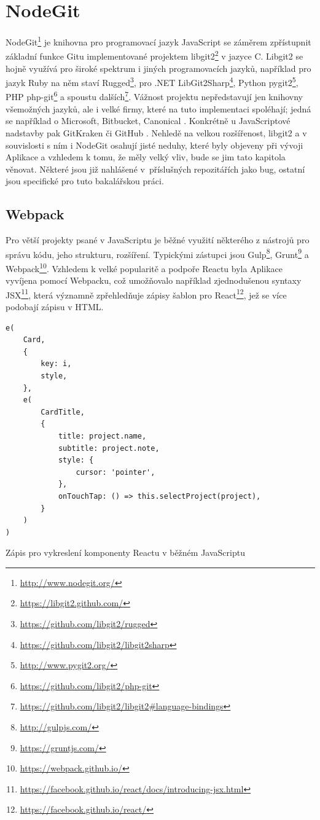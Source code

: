 \chapter{NodeGit}

NodeGit\footnote{\url{http://www.nodegit.org/}} je knihovna pro programovací jazyk JavaScript se záměrem zpřístupnit základní funkce Gitu implementované projektem libgit2\footnote{\url{https://libgit2.github.com/}} v jazyce C. Libgit2 se hojně využívá pro široké spektrum i jiných programovacích jazyků, například pro jazyk Ruby na něm staví Rugged\footnote{\url{https://github.com/libgit2/rugged}}, pro .NET LibGit2Sharp\footnote{\url{https://github.com/libgit2/libgit2sharp}}, Python pygit2\footnote{\url{http://www.pygit2.org/}}, PHP php-git\footnote{\url{https://github.com/libgit2/php-git}} a spoustu dalších\footnote{\url{https://github.com/libgit2/libgit2\#language-bindings}}. Vážnost projektu nepředstavují jen knihovny všemožných jazyků, ale i velké firmy, které na tuto implementaci spoléhají; jedná se například o Microsoft, Bitbucket, Canonical \cite{libgit2-companies}. Konkrétně u JavaScriptové nadstavby pak GitKraken či GitHub \cite{nodegit-products}. Nehledě na velkou rozšířenost, libgit2 a v souvislosti s ním i NodeGit osahují jisté neduhy, které byly objeveny při vývoji Aplikace a vzhledem k tomu, že měly velký vliv, bude se jim tato kapitola věnovat. Některé jsou již nahlášené v~příslušných repozitářích jako bug, ostatní jsou specifické pro tuto bakalářskou práci.

\section{Webpack}

Pro větší projekty psané v JavaScriptu je běžné využití některého z nástrojů pro správu kódu, jeho strukturu, rozšíření. Typickými zástupci jsou Gulp\footnote{\url{http://gulpjs.com/}}, Grunt\footnote{\url{https://gruntjs.com/}} a Webpack\footnote{\url{https://webpack.github.io/}}. Vzhledem k velké popularitě a podpoře Reactu byla Aplikace vyvíjena pomocí Webpacku, což umožňovalo například zjednodušenou syntaxy JSX\footnote{\url{https://facebook.github.io/react/docs/introducing-jsx.html}}, která významně zpřehledňuje zápisy šablon pro React\footnote{\url{https://facebook.github.io/react/}}, jež se více podobají zápisu v HTML.

\begin{listing}[ht]
\begin{verbatim}
e(
	Card,
	{
		key: i,
		style,
	},
	e(
		CardTitle,
		{
			title: project.name,
			subtitle: project.note,
			style: {
				cursor: 'pointer',
			},
			onTouchTap: () => this.selectProject(project),
		}
	)
)
\end{verbatim}
\caption[Komponenta v JavaScriptu]{Zápis pro vykreslení komponenty Reactu v běžném JavaScriptu}
\end{listing}

